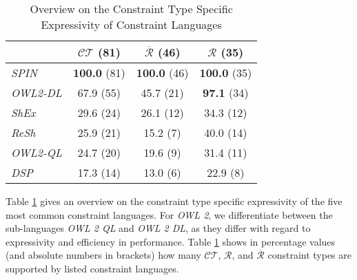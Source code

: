 \documentclass{acm_proc_article-sp}
\begin{document}
\begin{table}[H]
	\centering
		\caption{Overview on the Constraint Type Specific Expressivity of Constraint Languages}
	  \scriptsize
		\begin{tabular}{l|c|c|c}
			\textbf{} & $\mathcal{CT}$ (81) & $\overline{\mathcal{R}}$ (46) & $\mathcal{R}$ (35) \\	
      \hline
			\emph{SPIN} & \textbf{100.0} (81) & \textbf{100.0} (46) & \textbf{100.0} (35) \\
			\emph{OWL2-DL} & 67.9 (55) & 45.7 (21) & \textbf{97.1} (34) \\ 
			\emph{ShEx} & 29.6 (24) & 26.1 (12) & 34.3 (12) \\
			\emph{ReSh} & 25.9 (21) & 15.2 (7) & 40.0 (14) \\
			\emph{OWL2-QL} & 24.7 (20) & 19.6 (9) & 31.4 (11) \\
			\emph{DSP} & 17.3 (14) & 13.0 (6) & 22.9 (8) 
		\end{tabular}
	\label{tab:constraint-type-specific-expressivity}
\end{table}
Table \ref{tab:constraint-type-specific-expressivity} 
gives an overview on the constraint type specific expressivity of the five most common constraint languages.
For \emph{OWL 2}, we differentiate between the sub-languages \emph{OWL 2 QL} and \emph{OWL 2 DL}, as they differ with regard to expressivity and efficiency in performance.
Table \ref{tab:constraint-type-specific-expressivity} shows in percentage values (and absolute numbers in brackets) how many $\mathcal{CT}$, $\mathcal{R}$, and $\overline{\mathcal{R}}$ constraint types are supported 
by listed constraint languages.
\end{document}
